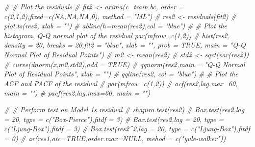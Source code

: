 \documentclass[
]{article}
\newenvironment{Shaded}{\begin{snugshade}}{\end{snugshade}}
\newcommand{\CommentTok}[1]{\textcolor[rgb]{0.56,0.35,0.01}{\textit{#1}}}
\begin{document}
\begin{Shaded}
\begin{Highlighting}[]
\CommentTok{\# \# Plot the residuals}
\CommentTok{\# fit2 \textless{}{-} arima(c\_train.bc, order = c(2,1,2),fixed=c(NA,NA,NA,0), method = "ML") }
\CommentTok{\# res2 \textless{}{-} residuals(fit2)}
\CommentTok{\# plot.ts(res2, xlab = "")}
\CommentTok{\# abline(h=mean(res2),col = "blue")}
\CommentTok{\# \# Plot the histogram, Q{-}Q normal plot of the residual par(mfrow=c(1,2))}
\CommentTok{\# hist(res2, density = 20, breaks = 20,fit2 = "blue", xlab = "", prob = TRUE, main = "Q{-}Q Normal Plot of Residual Points") }
\CommentTok{\# m2 \textless{}{-} mean(res2)}
\CommentTok{\# std2 \textless{}{-} sqrt(var(res2)) }
\CommentTok{\# curve(dnorm(x,m2,std2),add = TRUE)}
\CommentTok{\# qqnorm(res2,main = "Q{-}Q Normal Plot of Residual Points", xlab = "") }
\CommentTok{\# qqline(res2, col = "blue")}
\CommentTok{\# \# Plot the ACF and PACF of the residual}
\CommentTok{\# par(mfrow=c(1,2)) }
\CommentTok{\# acf(res2,lag.max=60, main = "") }
\CommentTok{\# pacf(res2,lag.max=60, main = "")}
\end{Highlighting}
\end{Shaded}

\begin{Shaded}
\begin{Highlighting}[]
\CommentTok{\# \# Perform test on Model 1\textquotesingle{}s residual}
\CommentTok{\# shapiro.test(res2)}
\CommentTok{\# Box.test(res2,lag = 20, type = c("Box{-}Pierce"),fitdf = 3) }
\CommentTok{\# Box.test(res2,lag = 20, type = c("Ljung{-}Box"),fitdf = 3) }
\CommentTok{\# Box.test(res2\^{}2,lag = 20, type = c("Ljung{-}Box"),fitdf = 0) }
\CommentTok{\# ar(res1,aic=TRUE,order.max=NULL, mehod = c("yule{-}walker"))}
\end{Highlighting}
\end{Shaded}
\end{document}
